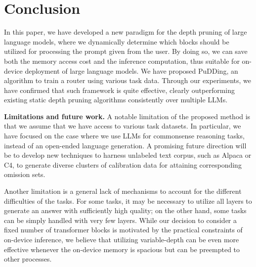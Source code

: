 \section{Conclusion}
In this paper, we have developed a new paradigm for the depth pruning of large language models, where we dynamically determine which blocks should be utilized for processing the prompt given from the user. By doing so, we can save both the memory access cost and the inference computation, thus suitable for on-device deployment of large language models. We have proposed PuDDing, an algorithm to train a router using various task data. Through our experiments, we have confirmed that such framework is quite effective, clearly outperforming existing static depth pruning algorithms consistently over multiple LLMs.

\textbf{Limitations and future work.} A notable limitation of the proposed method is that we assume that we have access to various task datasets. In particular, we have focused on the case where we use LLMs for commonsense reasoning tasks, instead of an open-ended language generation. A promising future direction will be to develop new techniques to harness unlabeled text corpus, such as Alpaca or C4, to generate diverse clusters of calibration data for attaining corresponding omission sets.

Another limitation is a general lack of mechanisms to account for the different difficulties of the tasks. For some tasks, it may be necessary to utilize all layers to generate an answer with sufficiently high quality; on the other hand, some tasks can be simply handled with very few layers. While our decision to consider a fixed number of transformer blocks is motivated by the practical constraints of on-device inference, we believe that utilizing variable-depth can be even more effective whenever the on-device memory is spacious but can be preempted to other processes.
